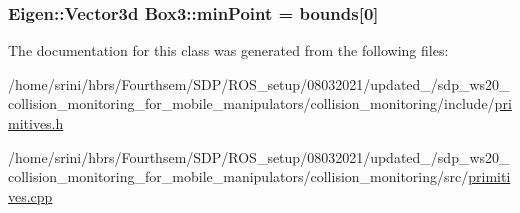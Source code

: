 \subsubsection[{\texorpdfstring{min\+Point}{minPoint}}]{\setlength{\rightskip}{0pt plus 5cm}Eigen\+::\+Vector3d Box3\+::min\+Point = {\bf bounds}\mbox{[}0\mbox{]}}\hypertarget{class_box3_aa4e23702bbefb388799ad2ed7cfa0633}{}\label{class_box3_aa4e23702bbefb388799ad2ed7cfa0633}


The documentation for this class was generated from the following files\+:\begin{DoxyCompactItemize}
\item 
/home/srini/hbrs/\+Fourthsem/\+S\+D\+P/\+R\+O\+S\+\_\+setup/08032021/updated\+\_/sdp\+\_\+ws20\+\_\+collision\+\_\+monitoring\+\_\+for\+\_\+mobile\+\_\+manipulators/collision\+\_\+monitoring/include/\hyperlink{primitives_8h}{primitives.\+h}\item 
/home/srini/hbrs/\+Fourthsem/\+S\+D\+P/\+R\+O\+S\+\_\+setup/08032021/updated\+\_/sdp\+\_\+ws20\+\_\+collision\+\_\+monitoring\+\_\+for\+\_\+mobile\+\_\+manipulators/collision\+\_\+monitoring/src/\hyperlink{primitives_8cpp}{primitives.\+cpp}\end{DoxyCompactItemize}
